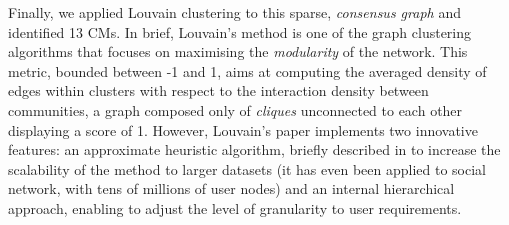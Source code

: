 \documentclass[mainlanguage=english,numlaboratories=2, nofrontcover=true,noaim=false, localbibs, colophon-location=verso-frontcover, oneside, 10pt, localtocs, version=final, nomakeabstract=true]{yathesis}
\begin{document}
{Finally, we applied Louvain clustering \autocite{blondel_etal08} to this sparse, \emph{consensus graph} and identified 13 CMs. In brief, Louvain's method is one of the graph clustering algorithms that focuses on maximising the \emph{modularity} of the network. This metric, bounded between -1 and 1, aims at computing the averaged density of edges within clusters with respect to the interaction density between communities, a graph composed only of \textit{cliques} unconnected to each other displaying a score of 1. However, Louvain's paper implements two innovative features: an approximate heuristic algorithm, briefly described in  to increase the scalability of the method to larger datasets (it has even been applied to social network, with tens of millions of user nodes) and an internal hierarchical approach, enabling to adjust the level of granularity to user requirements.

}
\end{document}
